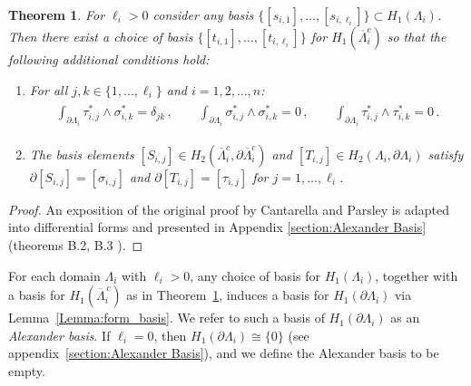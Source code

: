 \documentclass[11pt]{article}
\theoremstyle{plain}
\newtheorem{theorem}{Theorem}[section]
\theoremstyle{definition}
\theoremstyle{remark}
\newcommand{\ST}{\Lambda}
\begin{document}
\begin{theorem}\label{thr:Alexander}
    For \(\ell_i > 0\) consider any basis \( \{ [s_{i,1}], \dots , [s_{i,\ell_i}]\} \subset H_1 ( \ST_i) \). Then there exist a choice of basis \(\{[t_{i,1}], \dots , [t_{i,\ell_i}]\}\) for \(H_1 (\overline{\ST}^c_i )\) so that the following additional conditions hold:
    \begin{enumerate}
        \item For all \( j, k \in \{ 1, \dots, \ell_i \} \) and \(i = 1,2, \dots, n\): 
        \begin{align*}
        \begin{gathered}
             \int_{\partial \ST_i} \tau_{i,j}^* \wedge \sigma_{i,k}^* = \delta_{jk}  \,, \qquad
            \int_{\partial \ST_i} \sigma_{i,j}^* \wedge \sigma_{i,k}^* = 
             0 \,,    \qquad 
             \int_{\partial \ST_i} \tau_{i,j}^* \wedge \tau_{i,k}^*
            = 0 \, .
        \end{gathered}
        \end{align*}   
        \item The basis elements \( [S_{i,j}] \in H_2( \overline{\ST}^c_i, \partial \overline{\ST}^c_i) \) and \( [T_{i,j}] \in H_2( \ST_i, \partial \ST_i) \) satisfy \( \partial [S_{i,j}] =  [\sigma_{i,j}] \) and \( \partial [T_{i,j}] =  [\tau_{i,j}] \) for \( j = 1, \dots, \ell_i \). 
    \end{enumerate}
\end{theorem}


\begin{proof}
    An exposition of the original proof by Cantarella and Parsley is adapted into differential forms and presented in Appendix \ref{section:Alexander Basis} (theorems B.2, B.3 \cite{CANTARELLA20101127}). 
\end{proof}




For each domain \(\ST_i\) with \(\ell_i > 0\), any choice of basis for \(H_1(\ST_i)\), together with a basis for \(H_1(\overline{\ST}_i^{\,c})\) as in Theorem~\ref{thr:Alexander}, induces a basis for \(H_1(\partial \ST_i)\) via Lemma~\ref{Lemma:form_basis}. We refer to such a basis of \(H_1(\partial \ST_i)\) as an \emph{Alexander basis}. If \(\ell_i = 0\), then \(H_1(\partial \ST_i) \cong \{0\}\) (see appendix~\ref{section:Alexander Basis}), and we define the Alexander basis to be empty.
\end{document}
